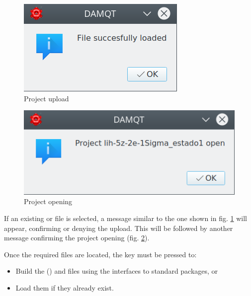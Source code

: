 \documentclass[10pt]{article}
\begin{document}
\begin{center}
\begin{minipage}{.25\linewidth}
\begin{figure}[H]
\begin{center}
\vspace*{-2mm}
\includegraphics[width=.6\linewidth]{damqt320_info_load.png}
\end{center}
\caption{Project upload \label{fig:2_1_3}}
\end{figure}
\end{minipage}
\begin{minipage}{.25\linewidth}
\begin{figure}[H]
\begin{center}
\vspace*{-2mm}
\includegraphics[width=.87\linewidth]{damqt320_info_open.png}
\end{center}
\caption{Project opening\label{fig:2_1_4}}
\end{figure}
\end{minipage}
\end{center}

If an existing \ggbs{ } or \sgbs{ } file is selected, a message
similar to the one shown in fig. \ref{fig:2_1_3} will appear, confirming or denying the upload.
This will be followed by another message confirming the project opening (fig. \ref{fig:2_1_4}).

Once the required files are located, the \exec key must be pressed to:
\begin{itemize}
\item Build the \ggbs{ } (\sgbs{ }) and \den{ } files using the interfaces to standard packages, or
\item Load them if they already exist.
\end{itemize}
\end{document}
